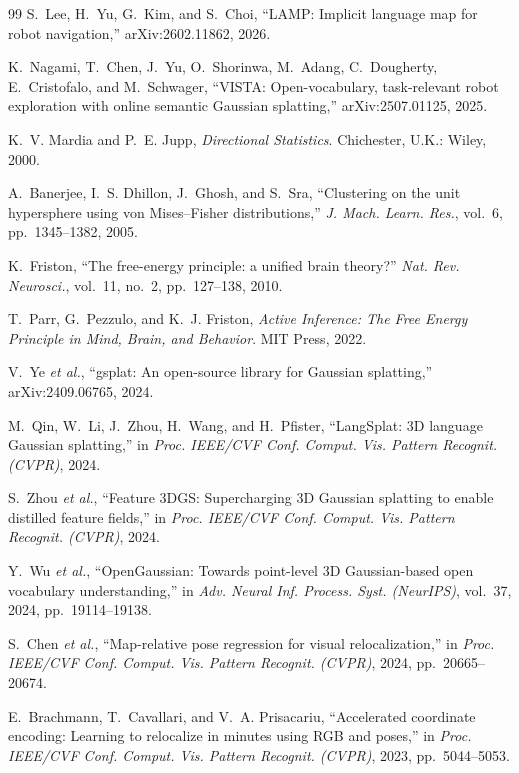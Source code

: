 \documentclass[journal]{IEEEtran}
\begin{document}
\begin{thebibliography}{99}
 S.~Lee, H.~Yu, G.~Kim, and S.~Choi, ``LAMP: Implicit
language map for robot navigation,'' arXiv:2602.11862, 2026.

 K.~Nagami, T.~Chen, J.~Yu, O.~Shorinwa, M.~Adang,
C.~Dougherty, E.~Cristofalo, and M.~Schwager, ``VISTA: Open-vocabulary,
task-relevant robot exploration with online semantic Gaussian splatting,''
arXiv:2507.01125, 2025.

 K.~V. Mardia and P.~E. Jupp, \emph{Directional
Statistics}. Chichester, U.K.: Wiley, 2000.

 A.~Banerjee, I.~S. Dhillon, J.~Ghosh, and S.~Sra,
``Clustering on the unit hypersphere using von Mises--Fisher distributions,''
\emph{J. Mach. Learn. Res.}, vol.~6, pp.~1345--1382, 2005.

 K.~Friston, ``The free-energy principle: a unified brain
theory?'' \emph{Nat. Rev. Neurosci.}, vol.~11, no.~2, pp.~127--138, 2010.

 T.~Parr, G.~Pezzulo, and K.~J. Friston, \emph{Active
Inference: The Free Energy Principle in Mind, Brain, and Behavior}. MIT Press,
2022.

V.~Ye \emph{et al.}, ``gsplat: An open-source library for Gaussian splatting,''
arXiv:2409.06765, 2024.

 M.~Qin, W.~Li, J.~Zhou, H.~Wang, and H.~Pfister,
``LangSplat: 3D language Gaussian splatting,'' in \emph{Proc. IEEE/CVF Conf.
Comput. Vis. Pattern Recognit. (CVPR)}, 2024.

S.~Zhou \emph{et al.}, ``Feature 3DGS: Supercharging 3D Gaussian splatting to
enable distilled feature fields,'' in \emph{Proc. IEEE/CVF Conf. Comput. Vis.
Pattern Recognit. (CVPR)}, 2024.

 Y.~Wu \emph{et al.}, ``OpenGaussian: Towards
point-level 3D Gaussian-based open vocabulary understanding,'' in \emph{Adv.
Neural Inf. Process. Syst. (NeurIPS)}, vol.~37, 2024, pp.~19114--19138.

 S.~Chen \emph{et al.}, ``Map-relative pose regression
for visual relocalization,'' in \emph{Proc. IEEE/CVF Conf. Comput. Vis. Pattern
Recognit. (CVPR)}, 2024, pp.~20665--20674.

 E.~Brachmann, T.~Cavallari, and V.~A. Prisacariu,
``Accelerated coordinate encoding: Learning to relocalize in minutes using RGB
and poses,'' in \emph{Proc. IEEE/CVF Conf. Comput. Vis. Pattern Recognit.
(CVPR)}, 2023, pp.~5044--5053.


\end{thebibliography}
\end{document}
